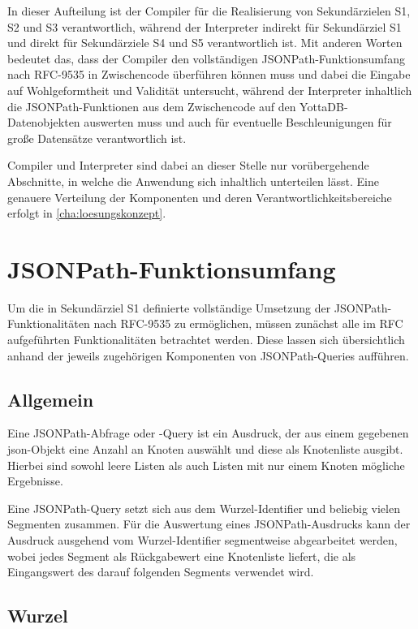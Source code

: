\documentclass[oneside]{ausarbeitung}
\begin{document}
In dieser Aufteilung ist der Compiler für die Realisierung von Sekundärzielen S1, S2 und S3 verantwortlich, während der Interpreter indirekt für Sekundärziel S1 und direkt für Sekundärziele S4 und S5 verantwortlich ist. Mit anderen Worten bedeutet das, dass der Compiler den vollständigen JSONPath-Funktionsumfang nach RFC-9535 in Zwischencode überführen können muss und dabei die Eingabe auf Wohlgeformtheit und Validität untersucht, während der Interpreter inhaltlich die JSONPath-Funktionen aus dem Zwischencode auf den YottaDB-Datenobjekten auswerten muss und auch für eventuelle Beschleunigungen für große Datensätze verantwortlich ist.
	
Compiler und Interpreter sind dabei an dieser Stelle nur vorübergehende Abschnitte, in welche die Anwendung sich inhaltlich unterteilen lässt. Eine genauere Verteilung der Komponenten und deren Verantwortlichkeitsbereiche erfolgt in \ref{cha:loesungskonzept}.
	
	
	
\section{JSONPath-Funktionsumfang}
Um die in Sekundärziel S1 definierte vollständige Umsetzung der JSONPath-Funktionalitäten nach RFC-9535 zu ermöglichen, müssen zunächst alle im RFC aufgeführten Funktionalitäten betrachtet werden. Diese lassen sich übersichtlich anhand der jeweils zugehörigen Komponenten von JSONPath-Queries aufführen.
	
\subsection{Allgemein}
	
Eine JSONPath-Abfrage oder -Query ist ein Ausdruck, der aus einem gegebenen \ac{json}-Objekt eine Anzahl an Knoten auswählt und diese als Knotenliste ausgibt. Hierbei sind sowohl leere Listen als auch Listen mit nur einem Knoten mögliche Ergebnisse.
	
Eine JSONPath-Query setzt sich aus dem Wurzel-Identifier und beliebig vielen Segmenten zusammen. Für die Auswertung eines JSONPath-Ausdrucks kann der Ausdruck ausgehend vom Wurzel-Identifier segmentweise abgearbeitet werden, wobei jedes Segment als Rückgabewert eine Knotenliste liefert, die als Eingangswert des darauf folgenden Segments verwendet wird. 

	
\subsection{Wurzel}
	
\end{document}
